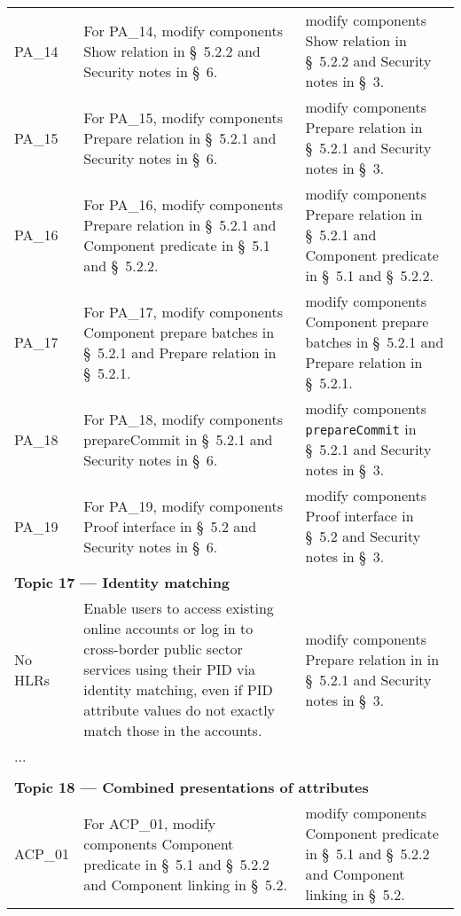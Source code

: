 \begin{landscape}
\begin{longtable}{p{3cm} p{10cm} p{7cm}}
PA\_14 &
For PA\_14, modify components Show relation in \S~5.2.2 and Security notes in \S~6. &
modify components Show relation in \S~5.2.2 and Security notes in \S~3. \\

PA\_15 &
For PA\_15, modify components Prepare relation in \S~5.2.1 and Security notes in \S~6. &
modify components Prepare relation in \S~5.2.1 and Security notes in \S~3. \\

PA\_16 &
For PA\_16, modify components Prepare relation in \S~5.2.1 and Component predicate in \S~5.1 and \S~5.2.2. &
modify components Prepare relation in \S~5.2.1 and Component predicate in \S~5.1 and \S~5.2.2. \\

PA\_17 &
For PA\_17, modify components Component prepare batches in \S~5.2.1 and Prepare relation in \S~5.2.1. &
modify components Component prepare batches in \S~5.2.1 and Prepare relation in \S~5.2.1. \\

PA\_18 &
For PA\_18, modify components prepareCommit in \S~5.2.1 and Security notes in \S~6. &
modify components \texttt{prepareCommit} in \S~5.2.1 and Security notes in \S~3. \\

PA\_19 &
For PA\_19, modify components Proof interface in \S~5.2 and Security notes in \S~6. &
modify components Proof interface in \S~5.2 and Security notes in \S~3. \\[1em]


\multicolumn{3}{l}{\textbf{Topic 17 — Identity matching}}\\

No HLRs &
Enable users to access existing online accounts or log in to cross-border public sector services using their PID via identity matching, even if PID attribute values do not exactly match those in the accounts. &
modify components Prepare relation in in \S~5.2.1 and Security notes in \S~3. \\[1em]

\multicolumn{3}{l}{...}\\\\[-0.5em]


\multicolumn{3}{l}{\textbf{Topic 18 — Combined presentations of attributes}}\\

ACP\_01 &
For ACP\_01, modify components Component predicate in \S~5.1 and \S~5.2.2 and Component linking in \S~5.2. &
modify components Component predicate in \S~5.1 and \S~5.2.2 and Component linking in \S~5.2. \\


\end{longtable}
\end{landscape}
